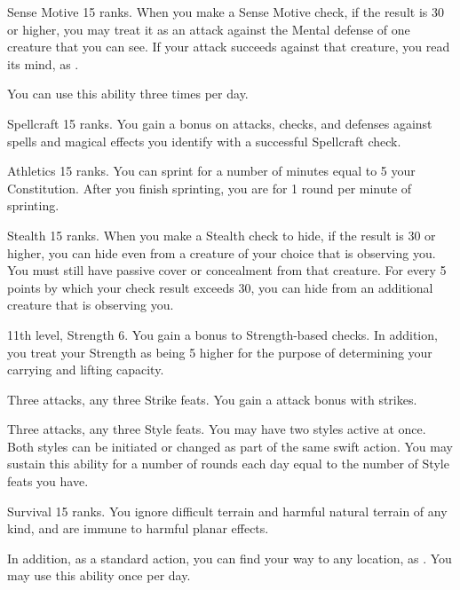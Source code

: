\featpre Sense Motive 15 ranks.
\featben When you make a Sense Motive check, if the result is 30 or higher, you may treat it as an attack against the Mental defense of one creature that you can see.
If your attack succeeds against that creature, you read its mind, as .

You can use this ability three times per day.

\featpre Spellcraft 15 ranks.
\featben You gain a  bonus on attacks, checks, and defenses against spells and magical effects you identify with a successful Spellcraft check.

\featpre Athletics 15 ranks.
\featben You can sprint for a number of minutes equal to 5 \add your Constitution.
After you finish sprinting, you are \fatigued for 1 round per minute of sprinting.

\featpre Stealth 15 ranks.
\featben When you make a Stealth check to hide, if the result is 30 or higher, you can hide even from a creature of your choice that is observing you.
You must still have passive cover or concealment from that creature.
For every 5 points by which your check result exceeds 30, you can hide from an additional creature that is observing you.

\featpres 11th level, Strength 6.
\featben You gain a  bonus to Strength-based checks.
In addition, you treat your Strength as being 5 higher for the purpose of determining your carrying and lifting capacity.

\featpres Three attacks, any three Strike feats.
\featben You gain a  attack bonus with strikes.

\featpres Three attacks, any three Style feats.
\featben You may have two styles active at once.
Both styles can be initiated or changed as part of the same swift action.
You may sustain this ability for a number of rounds each day equal to the number of Style feats you have.

\featpre Survival 15 ranks.
\featben You ignore difficult terrain and harmful natural terrain of any kind, and are immune to harmful planar effects.

In addition, as a standard action, you can find your way to any location, as .
You may use this ability once per day.

